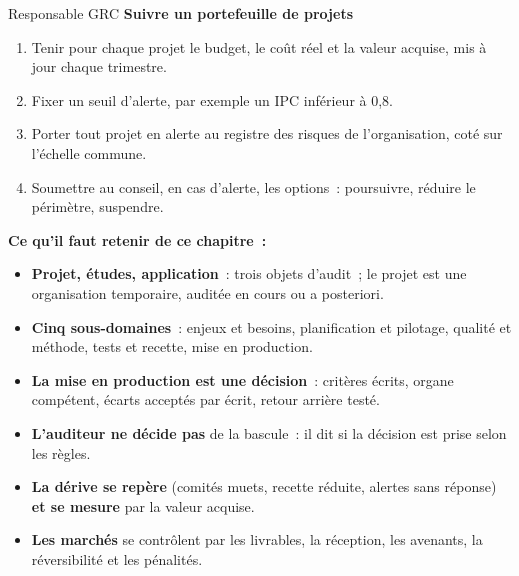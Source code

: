 \begin{boxmetier}{Responsable GRC}
\textbf{Suivre un portefeuille de projets}
\begin{enumerate}
    \item Tenir pour chaque projet le budget, le coût réel et la valeur
          acquise, mis à jour chaque trimestre.
    \item Fixer un seuil d'alerte, par exemple un IPC inférieur à 0,8.
    \item Porter tout projet en alerte au registre des risques de
          l'organisation, coté sur l'échelle commune.
    \item Soumettre au conseil, en cas d'alerte, les options~: poursuivre,
          réduire le périmètre, suspendre.
\end{enumerate}
\end{boxmetier}


\separateur

\begin{boxresume}
\textbf{Ce qu'il faut retenir de ce chapitre~:}
\begin{itemize}
    \item \textbf{Projet, études, application}~: trois objets d'audit~; le
          projet est une organisation temporaire, auditée en cours ou a
          posteriori.
    \item \textbf{Cinq sous-domaines}~: enjeux et besoins, planification et
          pilotage, qualité et méthode, tests et recette, mise en
          production.
    \item \textbf{La mise en production est une décision}~: critères écrits,
          organe compétent, écarts acceptés par écrit, retour arrière testé.
    \item \textbf{L'auditeur ne décide pas} de la bascule~: il dit si la
          décision est prise selon les règles.
    \item \textbf{La dérive se repère} (comités muets, recette réduite,
          alertes sans réponse) \textbf{et se mesure} par la valeur acquise.
    \item \textbf{Les marchés} se contrôlent par les livrables, la réception,
          les avenants, la réversibilité et les pénalités.
\end{itemize}
\end{boxresume}

\bigskip

